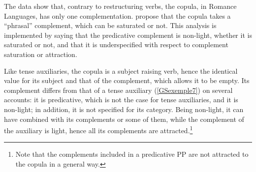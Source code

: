 \documentclass[output=paper
                ,modfonts
                ,nonflat
	        ,collection
	        ,collectionchapter
	        ,collectiontoclongg
 	        ,biblatex
                ,babelshorthands
                ,newtxmath
                ,draftmode
                ,colorlinks, citecolor=brown
]{./langsci/langscibook}
\begin{document}
{\begin{exe}
	\ex \label{GSexemple34} 
	\begin{xlist}
        \label{GSexemple34a}

		\label{GSexemple34b}
		
		\label{GSexemple34c}
	\end{xlist}
\end{exe}

The data show that, contrary to restructuring verbs, the copula, in Romance Languages, has only one complementation. \cite{AG2002b-u, AG2010} propose that the copula takes a ``phrasal'' complement, which can be saturated or not. This analysis is implemented by saying that the predicative complement is non-light, whether it is saturated or not, and that it is underspecified with respect to complement saturation or attraction.

\begin{exe}
        \label{GSexemple35}
\end{exe}

Like tense auxiliaries, the copula is a subject raising verb, hence the identical value  for its subject and that of the complement, which allows it to be empty. Its complement differs from that of a tense auxiliary (\ref{GSexemple7}) on several accounts: it is predicative, which is not the case for tense auxiliaries, and it is non-light; in addition, it is not specified for its category. Being non-light, it can have combined with its complements or some of them, while the complement of the auxiliary is light, hence all its complements are attracted.\footnote{Note that the complements included in a predicative PP are not attracted to the copula in a general way.}  

}
\end{document}
